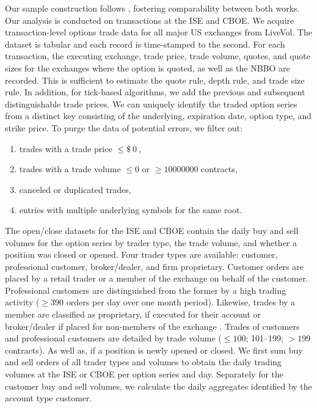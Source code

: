 Our sample construction follows \textcite[\checkmark][7--9]{grauerOptionTradeClassification2022}, fostering comparability between both works. Our analysis is conducted on transactions at the \gls{ISE} and \gls{CBOE}. We acquire transaction-level options trade data for all major US exchanges from LiveVol. The dataset is tabular and each record is time-stamped to the second. For each transaction, the executing exchange, trade price, trade volume, quotes, and quote sizes for the exchanges where the option is quoted, as well as the \gls{NBBO} are recorded. This is sufficient to estimate the quote rule, depth rule, and trade size rule. In addition, for tick-based algorithms, we add the previous and subsequent distinguishable trade prices. We can uniquely identify the traded option series from a distinct key consisting of the underlying, expiration date, option type, and strike price. To purge the data of potential errors, we filter out:
\begin{enumerate}[label=(\roman*),noitemsep]
    \item trades with a trade price $\leq \SI{0}[\$]{}$,
    \item trades with a trade volume $\leq 0$ or $\ge \num{10000000}$ contracts,
    \item canceled or duplicated trades,
    \item entries with multiple underlying symbols for the same root.
\end{enumerate}


The open/close datasets for the \gls{ISE} and \gls{CBOE} contain the daily buy and sell volumes for the option series by trader type, the trade volume, and whether a position was closed or opened. Four trader types are available: customer, professional customer, broker/dealer, and firm proprietary. Customer orders are placed by a retail trader or a member of the exchange on behalf of the customer. Professional customers are distinguished from the former by a high trading activity ($\geq390$ orders per day over one month period). Likewise, trades by a member are classified as proprietary, if executed for their account or broker/dealer if placed for non-members of the exchange \autocite[\checkmark][2]{nasdaqincFrequentlyAskedQuestions2017}. Trades of customers and professional customers are detailed by trade volume ($\leq 100$; 101--199; $> 199$ contracts). As well as, if a position is newly opened or closed. We first sum buy and sell orders of all trader types and volumes to obtain the daily trading volumes at the \gls{ISE} or \gls{CBOE} per option series and day. Separately for the customer buy and sell volumes, we calculate the daily aggregates identified by the account type customer.


